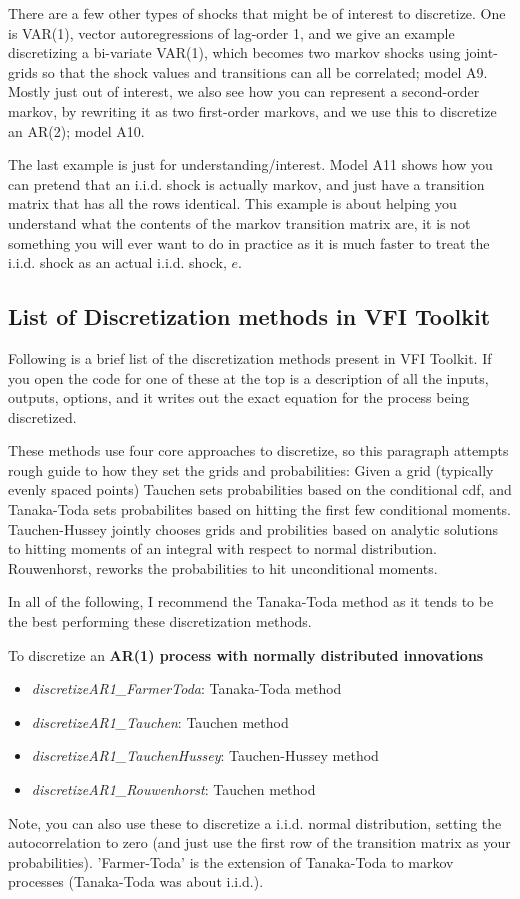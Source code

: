 There are a few other types of shocks that might be of interest to discretize. One is VAR(1), vector autoregressions of lag-order 1, and we give an example discretizing a bi-variate VAR(1), which becomes two markov shocks using joint-grids so that the shock values and transitions can all be correlated; model A9. Mostly just out of interest, we also see how you can represent a second-order markov, by rewriting it as two first-order markovs, and we use this to discretize an AR(2); model A10.

The last example is just for understanding/interest. Model A11 shows how you can pretend that an i.i.d. shock is actually markov, and just have a transition matrix that has all the rows identical. This example is about helping you understand what the contents of the markov transition matrix are, it is not something you will ever want to do in practice as it is much faster to treat the i.i.d. shock as an actual i.i.d. shock, $e$.

\subsection{List of Discretization methods in VFI Toolkit}
Following is a brief list of the discretization methods present in VFI Toolkit. If you open the code for one of these at the top is a description of all the inputs, outputs, options, and it writes out the exact equation for the process being discretized.

These methods use four core approaches to discretize, so this paragraph attempts rough guide to how they set the grids and probabilities: Given a grid (typically evenly spaced points) Tauchen sets probabilities based on the conditional cdf, and Tanaka-Toda sets probabilites based on hitting the first few conditional moments. Tauchen-Hussey jointly chooses grids and probilities based on analytic solutions to hitting moments of an integral with respect to normal distribution. Rouwenhorst, reworks the probabilities to hit unconditional moments.

In all of the following, I recommend the Tanaka-Toda method as it tends to be the best performing these discretization methods.

\smallskip
To discretize an \textbf{AR(1) process with normally distributed innovations}
\begin{itemize}
 \item \textit{discretizeAR1\_{}FarmerToda}: Tanaka-Toda method
 \item \textit{discretizeAR1\_{}Tauchen}: Tauchen method
 \item \textit{discretizeAR1\_{}TauchenHussey}: Tauchen-Hussey method
 \item \textit{discretizeAR1\_{}Rouwenhorst}: Tauchen method
\end{itemize}
Note, you can also use these to discretize a i.i.d. normal distribution, setting the autocorrelation to zero (and just use the first row of the transition matrix as your probabilities). 'Farmer-Toda' is the extension of Tanaka-Toda to markov processes (Tanaka-Toda was about i.i.d.).

